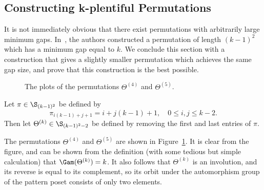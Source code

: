 \documentclass[12pt,twoside]{memoir}
\begin{document}
  \subsection{Constructing k-plentiful Permutations}

    It is not immediately obvious that there exist permutations with arbitrarily
    large minimum gaps. In~\cite{Flynn2007}, the authors constructed a
    permutation of length $(k-1)^2$ which has a minimum gap equal to $k$. 
    We conclude this section with a construction that gives a slightly smaller
    permutation which achieves the same gap size, and prove that this
    construction is the best possible. 

    \begin{figure}[t]
      \centering
       \hspace{4pc}
      \caption{The plots of the permutations $\Theta^{(4)}$ and $\Theta^{(5)}$.}
      \label{fixpat:fig:thetan}
    \end{figure}

    \begin{definition}
      Let $\pi \in \S_{(k-1)^2}$ be defined by 
      $$\pi_{i(k-1) + j + 1} = i + j(k-1) + 1, \quad 0 \leq i,j \leq k-2.$$
      Then let $\Theta^{(k)} \in \S_{(k-1)^2 - 2}$ be defined by removing the first
      and last entries of $\pi$. 
    \end{definition}



    
    The permutations $\Theta^{(4)}$ and $\Theta^{(5)}$ are shown in
    Figure~\ref{fixpat:fig:thetan}. It is clear from the figure, and can be
    shown from the definition (with some tedious but simple calculation) that
    $\Gam(\Theta^{(k)}) = k$. It also follows that $\Theta^{(k)}$ is an
    involution, and its reverse is equal to its complement, so its orbit
    under the automorphism group of the pattern poset consists of only two
    elements. 
\end{document}

